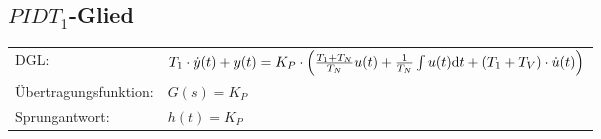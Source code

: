 \subsection{$PIDT_1$-Glied}
\begin{tabular}{ll}
\rule[-2ex]{0pt}{5.5ex} DGL: & \scriptsize$T_1 \cdot \dot{y}(t) +y(t) = K_P \cdot \left( \frac{T_1 + T_N}{T_N} u(t) + \frac{1}{T_N}\int u(t) \mathrm{d} t + (T_1 + T_V) \cdot \dot{u}(t) \right)$ \\ 
\rule[-2ex]{0pt}{5.5ex} Übertragungsfunktion: & $G(s) = K_P$ \\ 
\rule[-2ex]{0pt}{5.5ex} Sprungantwort: & $h(t) = K_P$ \\ 
\end{tabular}
